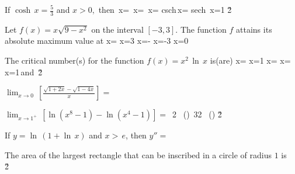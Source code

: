\documentclass[amsfonts,bezier,leqno,fleqn,12pt,a4paper]{article}
\begin{document}
\begin{large}
\item %
If $\displaystyle \cosh\,x=\frac{5}{3}$ and $x>0,$ then
\sc
\be
\displaystyle \tanh\,x=
\ee
\be
\displaystyle \coth\,x=
\ee
\be
\displaystyle \sinh\,x=
\ee
\be
\displaystyle \mbox{csch}\,x=
\ee
\be
\displaystyle \mbox{sech}\, x=1
\ee
\v2



\item %
Let $\displaystyle f(x)=x\sqrt{9-x^2}$ on the interval $[-3,3]$. The function $f$ attains its absolute maximum value at
\sc
\be
\displaystyle x=\displaystyle{}
\ee
\be
\displaystyle x=3
\ee
\be
\displaystyle x=\displaystyle-
\ee
\be
x=-3
\ee
\be
x=0
\ee
\newpage



\item %
The critical number(s) for the function $\displaystyle f(x)=x^2\,\ln\,x$ is(are)
\sc
\be
\displaystyle x=\displaystyle{}
\ee
\be
x=1
\ee
\be
\displaystyle x=
\ee
\be
\displaystyle x=
\ee
\be
\displaystyle x=1\,\mbox{and}\,
\ee
\v2



\item %
$\displaystyle \lim_{x\rightarrow 0}\, \left[ \frac{\sqrt{1+2x}-\sqrt{1-4x}}{x}\right]=$
\sc
{}
\ee
{}
\ee
{}
\ee
{}
\ee
{}
\ee
\newpage



\item %
$\displaystyle \lim_{x\rightarrow 1^+}\, \left[ \ln(x^8-1)-\ln(x^4-1)\right]=$
\sc
\be
\ln\,2
\ee
\be
\displaystyle \ln\, \left(\displaystyle{}\right)
\ee
\be
\ln\,32
\ee
\be
\displaystyle \ln\, \left(\displaystyle{}\right)
\ee
{}
\ee
\v2



\item %
If $\displaystyle y=\ln\,(1+\ln\,x)$ and $x>\,e$, then $y''=$
\sc
\be
\displaystyle {}
\ee
\be
\displaystyle {}
\ee
\be
\displaystyle {}
\ee
\be
\displaystyle {}
\ee
\be
\displaystyle {}
\ee
\newpage



\item %
The area of the largest rectangle that can be inscribed in a circle of radius $1$ is
\sc
{}
\ee
\be
\displaystyle {}
\ee
{}
\ee
\be
{}\,
\ee
{}\,\pi
\ee
\v2




\end{large}
\end{document}
